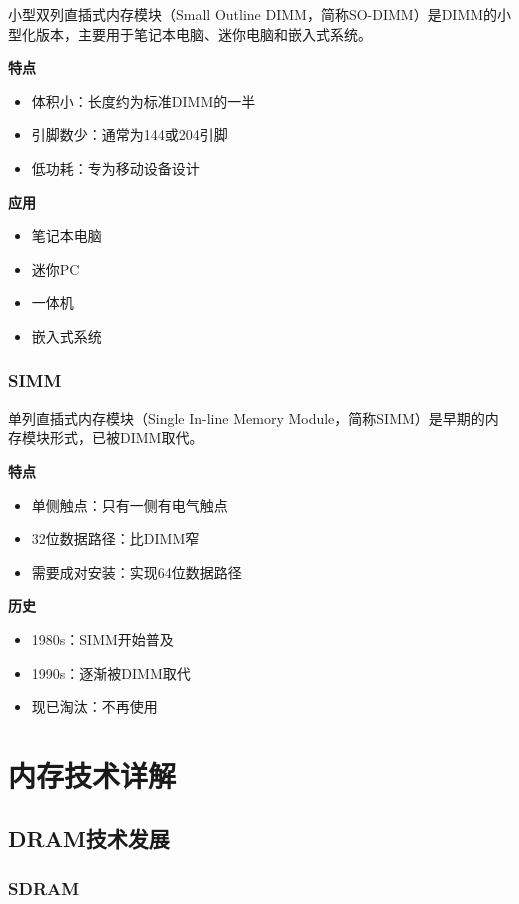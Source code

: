 \documentclass{article}
\begin{document}
小型双列直插式内存模块（Small Outline DIMM，简称SO-DIMM）是DIMM的小型化版本，主要用于笔记本电脑、迷你电脑和嵌入式系统。

\textbf{特点}
\begin{itemize}
    \item 体积小：长度约为标准DIMM的一半
    \item 引脚数少：通常为144或204引脚
    \item 低功耗：专为移动设备设计
\end{itemize}

\textbf{应用}
\begin{itemize}
    \item 笔记本电脑
    \item 迷你PC
    \item 一体机
    \item 嵌入式系统
\end{itemize}

\subsubsection{SIMM}

单列直插式内存模块（Single In-line Memory Module，简称SIMM）是早期的内存模块形式，已被DIMM取代。

\textbf{特点}
\begin{itemize}
    \item 单侧触点：只有一侧有电气触点
    \item 32位数据路径：比DIMM窄
    \item 需要成对安装：实现64位数据路径
\end{itemize}

\textbf{历史}
\begin{itemize}
    \item 1980s：SIMM开始普及
    \item 1990s：逐渐被DIMM取代
    \item 现已淘汰：不再使用
\end{itemize}

\section{内存技术详解}

\subsection{DRAM技术发展}

\subsubsection{SDRAM}
\end{document}

